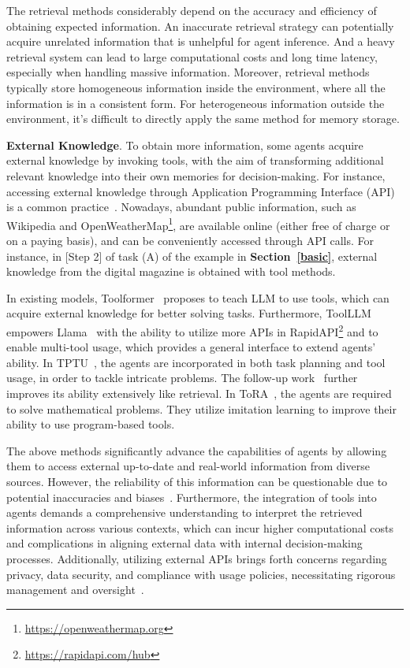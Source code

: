 \documentclass{article}
\theoremstyle{definition}
\theoremstyle{theorem}
\theoremstyle{proof}
\theoremstyle{remark}
\begin{document}
	The retrieval methods considerably depend on the accuracy and efficiency of obtaining expected information. An inaccurate retrieval strategy can potentially acquire unrelated information that is unhelpful for agent inference. And a heavy retrieval system can lead to large computational costs and long time latency, especially when handling massive information.
	Moreover, retrieval methods typically store homogeneous information inside the environment, where all the information is in a consistent form. For heterogeneous information outside the environment, it's difficult to directly apply the same method for memory storage. 
	
	\textbf{External Knowledge}.
	To obtain more information, some agents acquire external knowledge by invoking tools, with the aim of transforming additional relevant knowledge into their own memories for decision-making. 
	For instance, accessing external knowledge through Application Programming Interface (API) is a common practice~\cite{react,reflexion}. Nowadays, abundant public information, such as Wikipedia and OpenWeatherMap\footnote{\url{https://openweathermap.org}}, are available online (either free of charge or on a paying basis), and can be conveniently accessed through API calls.
	For instance, in [Step 2] of task (A) of the example in \textbf{Section~\ref{basic}}, external knowledge from the digital magazine is obtained with tool methods.
	
	In existing models, Toolformer~\cite{toolformer}
	proposes to teach LLM to use tools, which can acquire external knowledge for better solving tasks.
	Furthermore, ToolLLM~\cite{toolllm} empowers Llama~\cite{llama} with the ability to utilize more APIs in RapidAPI\footnote{\url{https://rapidapi.com/hub}} and to enable multi-tool usage, which provides a general interface to extend agents' ability.
	In TPTU~\cite{tptu}, the agents are incorporated in both task planning and tool usage, in order to tackle intricate problems. The follow-up work~\cite{tptu_v2} further improves its ability extensively like retrieval.
	In ToRA~\cite{tora}, the agents are required to solve mathematical problems. They utilize imitation learning to improve their ability to use program-based tools.
	
	The above methods significantly advance the capabilities of agents by allowing them to access external up-to-date and real-world information from diverse sources. However, the reliability of this information can be questionable due to potential inaccuracies and biases~\cite{survey_tool_learning}. Furthermore, the integration of tools into agents demands a comprehensive understanding to interpret the retrieved information across various contexts, which can incur higher computational costs and complications in aligning external data with internal decision-making processes. Additionally, utilizing external APIs brings forth concerns regarding privacy, data security, and compliance with usage policies, necessitating rigorous management and oversight~\cite{survey_tool_learning}.
	
\end{document}
